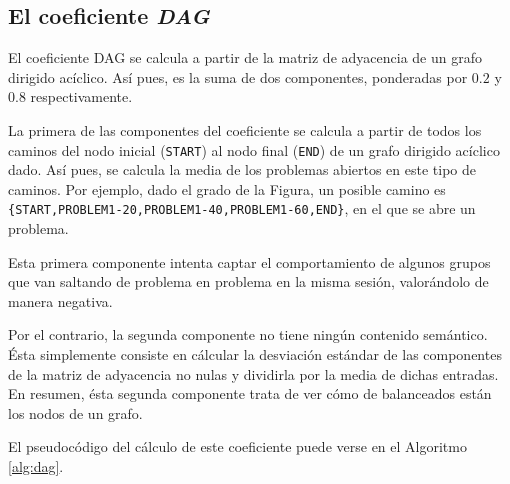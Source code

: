 \subsection{El coeficiente \emph{DAG}}

El coeficiente DAG se calcula a partir de la matriz de adyacencia de un
grafo dirigido acíclico. Así pues, es la suma de dos componentes, ponderadas
por $0.2$ y $0.8$ respectivamente.

La primera de las componentes del coeficiente se calcula a partir de todos
los caminos del nodo inicial (\texttt{START}) al nodo final (\texttt{END}) de un grafo dirigido
acíclico dado. Así pues, se calcula la media de los problemas abiertos en
este tipo de caminos. Por ejemplo, dado el grado de la Figura,
un posible camino es \texttt{\{START,PROBLEM1-20,PROBLEM1-40,PROBLEM1-60,END\}}, en el que se abre un problema.


Esta primera componente intenta captar el comportamiento de algunos grupos
que van saltando de problema en problema en la misma sesión, valorándolo
de manera negativa.

Por el contrario, la segunda componente no tiene ningún contenido semántico.
Ésta simplemente consiste en cálcular la desviación estándar de las componentes
de la matriz de adyacencia no nulas y dividirla por la media de dichas entradas.
En resumen, ésta segunda componente trata de ver cómo de balanceados están
los nodos de un grafo.

El pseudocódigo del cálculo de este coeficiente puede verse en el Algoritmo
\ref{alg:dag}.

